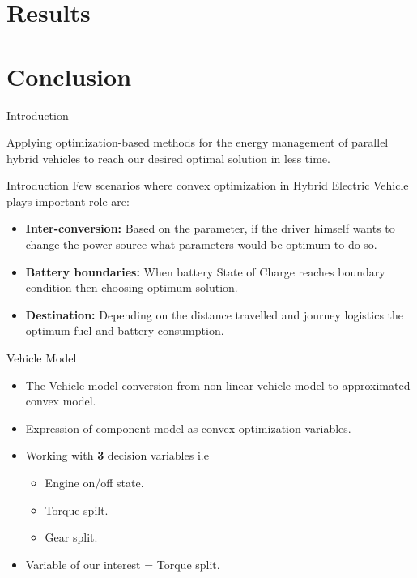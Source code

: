 \documentclass{beamer}
\begin{document}
\section{Results}
\section{Conclusion}





\begin{frame}{Introduction}
\begin{block}{ }
Applying optimization-based methods for the energy management of parallel hybrid vehicles to reach our desired optimal solution in less time.
\end{block}



\end{frame}
\begin{frame}{Introduction}
Few scenarios where convex optimization in Hybrid Electric Vehicle plays important role are:
\begin{itemize}
    \item \textbf{Inter-conversion:} Based on the parameter, if the driver himself wants to change the power source what parameters would be optimum to do so.
    \item \textbf{Battery boundaries:} When battery State of Charge reaches boundary condition then choosing optimum solution.
    \item \textbf{Destination:} Depending on the distance travelled and journey logistics the optimum fuel and battery consumption. 
\end{itemize}





\end{frame}

\begin{frame}{Vehicle Model}
    \begin{itemize}
        \item The Vehicle model conversion from non-linear vehicle model to approximated convex model.
        \item Expression of component model as convex optimization variables.
        \item Working with \textbf{3} decision variables i.e
        \begin{itemize}
            \item Engine on/off state.
            \item Torque spilt.
            \item Gear split.
        \end{itemize}
        \item Variable of our interest = Torque split.
    \end{itemize}
\end{frame}
\end{document}
